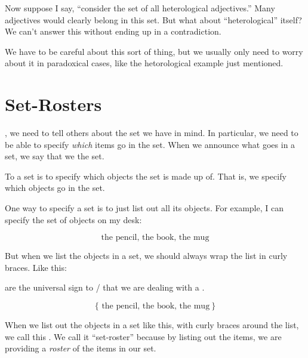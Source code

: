\documentclass[../../../main.tex]{subfiles}
\begin{document}
Now suppose I say, ``consider the set of all heterological adjectives.'' Many adjectives would clearly belong in this set. But what about ``heterological'' itself? We can't answer this without ending up in a contradiction.

We have to be careful about this sort of thing, but we usually only need to worry about it in paradoxical cases, like the hetorological example just mentioned.



\section{Set-Rosters}

, we need to tell others about the set we have in mind. In particular, we need to be able to specify \emph{which} items go in the set. When we announce what goes in a set, we say that we  the set.

\begin{terminology}
  To  a set is to specify which objects the set is made up of. That is, we specify which objects go in the set.
\end{terminology}

One way to specify a set is to just list out all its objects. For example, I can specify the set of objects on my desk:

\begin{equation*}
  \text{the pencil, the book, the mug}
\end{equation*}

But when we list the objects in a set, we should always wrap the list in curly braces. Like this:

\begin{aside}
  \begin{notation}
     are the universal sign to \mathers/ that we are dealing with a . 
  \end{notation}
\end{aside}

\begin{equation*}
  \{ \text{ the pencil, the book, the mug}~\}
\end{equation*}

When we list out the objects in a set like this, with curly braces around the list, we call this . We call it ``set-roster'' because by listing out the items, we are providing a \emph{roster} of the items in our set.
\end{document}
